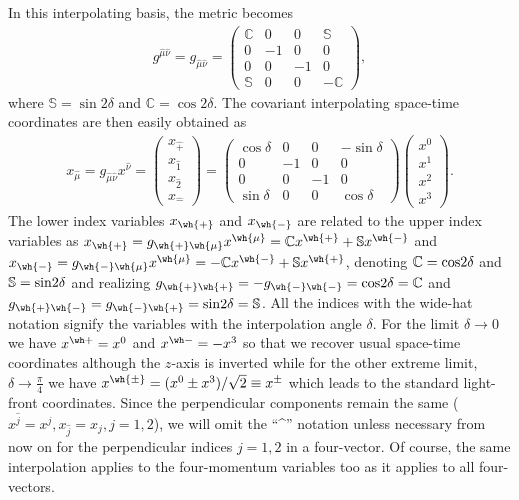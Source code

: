 \documentclass[12pt,a4paper]{report}
\newcommand{\itP}[1]{\hat{#1}}
\begin{document}
In this interpolating basis, the metric becomes
\begin{align}\label{eqn:g_munu_interpolation}
  g^{\hat{\mu}\hat{\nu}}
  = g_{\hat{\mu}\hat{\nu}}
  =
  \begin{pmatrix}
    \mathbb{C} & 0  & 0  & \mathbb{S} \\
    0 & -1 & 0  & 0 \\
    0 & 0  & -1 & 0 \\
    \mathbb{S} & 0  & 0  & -\mathbb{C}
  \end{pmatrix},
\end{align}
where $\mathbb{S}=\sin2\delta$ and $\mathbb{C}=\cos2\delta$.
The covariant interpolating space-time coordinates are then easily obtained as
\begin{align}\label{eqn:covariant_x_interpolation_definition}
  x_{\hat{\mu}}=g_{\hat{\mu}\hat{\nu}}x^{\hat{\nu}}=
  \begin{pmatrix}
   x_{\hat{+}}\\
    x_{\hat{1}}\\
    x_{\hat{2}}\\
    x_{\hat{-}}
  \end{pmatrix}
  =
  \begin{pmatrix}
    \cos\delta & 0  & 0  & -\sin\delta \\
    0          & -1 & 0  & 0 \\
    0          & 0  & -1 & 0 \\
    \sin\delta & 0  & 0  & \cos\delta
  \end{pmatrix}
  \begin{pmatrix}
    x^{0}\\
    x^{1}\\
    x^{2}\\
    x^{3}
  \end{pmatrix}.
\end{align}
The lower index variables $x_{\wh{+}}$ and $x_{\wh{-}}$
	are related to the upper index variables as $x_{\wh{+}}=g_{{\wh{+}\wh{\mu}}}x^{\wh{\mu}}=\mathbb{C}x^{\wh{+}}+\mathbb{S}x^{\wh{-}}$
        and $x_{\wh{-}}=g_{{\wh{-}\wh{\mu}}}x^{\wh{\mu}}=-\mathbb{C}x^{\wh{-}}+\mathbb{S}x^{\wh{+}}$, 
        denoting $\mathbb{C}=\rm{cos} 2\delta$ and $\mathbb{S}=\rm{sin} 2\delta$ and 
        realizing $g_{{\wh{+}\wh{+}}} = -g_{{\wh{-}\wh{-}}}=\rm{cos} 2\delta = \mathbb{C}$ and 
     	$g_{{\wh{+}\wh{-}}} = g_{{\wh{-}\wh{+}}}= \rm{sin} 2\delta = \mathbb{S}$.
		 All the indices with the
	wide-hat notation signify the variables with the interpolation angle
	$\delta$.  For the limit $\delta \rightarrow 0$ we have $x^{\wh+} = x^0$
	and $x^{\wh-} = -x^3$ so that we recover usual space-time coordinates
	although the $z$-axis is inverted while for the other extreme limit, $\delta
	\rightarrow \frac{\pi}{4}$ we have $x^{\wh{\pm}} = (x^0\pm x^3)/\sqrt{2}
	\equiv x^{\pm}$ which leads to the standard light-front coordinates.
	Since the perpendicular components remain the same ($x^{\itP{j}}=x^{j},x_{\itP{j}}=x_{j}, j=1,2$), 
	we will omit the ``\textasciicircum''  notation unless necessary from now on for 
	the perpendicular indices $j=1,2$ in a four-vector.
	Of course, the same interpolation applies to the four-momentum variables too as it applies to all four-vectors.
	
\end{document}
